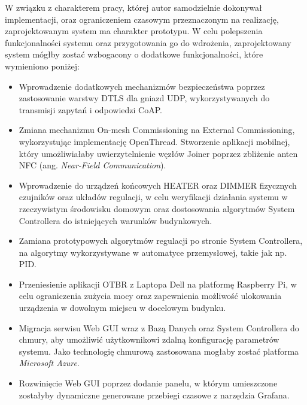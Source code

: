 W związku z charakterem pracy, której autor samodzielnie dokonywał implementacji, oraz ograniczeniem czasowym przeznaczonym na realizację, zaprojektowanym system ma charakter prototypu. W celu polepszenia funkcjonalności systemu oraz przygotowania go do wdrożenia,
zaprojektowany system mógłby zostać wzbogacony o dodatkowe funkcjonalności, które wymieniono poniżej:
\begin{itemize}
    \item Wprowadzenie dodatkowych mechanizmów bezpieczeństwa poprzez zastosowanie warstwy DTLS dla gniazd UDP, wykorzystywanych do transmisji zapytań i odpowiedzi CoAP. 
    \item Zmiana mechanizmu On-mesh Commissioning na External Commissioning, wykorzystując implementację  OpenThread. Stworzenie aplikacji mobilnej, który umożliwiałaby uwierzytelnienie węzłów Joiner poprzez zbliżenie anten NFC (ang. \textit{Near-Field Communication}).
    \item Wprowadzenie do urządzeń końcowych HEATER oraz DIMMER fizycznych czujników oraz układów regulacji, w celu weryfikacji działania systemu w rzeczywistym środowisku domowym oraz dostosowania algorytmów System Controllera do istniejących warunków budynkowych.
    \item Zamiana prototypowych algorytmów regulacji po stronie System Controllera, na algorytmy wykorzystywane w automatyce przemysłowej, takie jak np. PID.
    \item Przeniesienie aplikacji OTBR z Laptopa Dell na platformę Raspberry Pi, w celu ograniczenia zużycia mocy oraz zapewnienia możliwość ulokowania urządzenia w dowolnym miejscu w docelowym budynku.
    \item Migracja serwisu Web GUI wraz z Bazą Danych oraz System Controllera do chmury, aby umożliwić użytkownikowi zdalną konfigurację parametrów systemu. Jako technologię chmurową zastosowana mogłaby zostać platforma \textit{Microsoft Azure}.
    \item Rozwinięcie Web GUI poprzez dodanie panelu, w którym umieszczone zostałyby dynamiczne generowane przebiegi czasowe z narzędzia Grafana.
\end{itemize}

